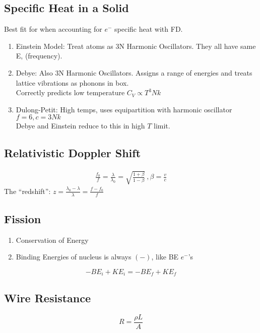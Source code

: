 \documentclass[10pt,a4paper]{article}
\begin{document}
\subsection{Specific Heat in a Solid}
Best fit for when accounting for $e^-$ specific heat with FD.
\begin{enumerate}
    \item Einstein Model: Treat atoms as 3N Harmonic Oscillators. They all have same E, (frequency).
    \item Debye: Also 3N Harmonic Oscillators. Assigns a range of energies and treats lattice vibrations as phonons in box.\\
    Correctly predicts low temperature $C_V \propto T^3Nk$
    \item Dulong-Petit: High temps, uses equipartition with harmonic oscillator $f=6,c=3Nk$\\
    Debye and Einstein reduce to this in high $T$ limit.
\end{enumerate}

\subsection{Relativistic Doppler Shift}
\begin{align}
 \frac{f_0}{f} = \frac{\lambda}{\lambda_0}  = \sqrt{\frac{1+\beta}{1-\beta}}~,\beta = \frac{v}{c}
\end{align}
The ``redshift'': $z = \frac{\lambda_0 - \lambda}{\lambda} = \frac{f - f_0}{f}$

\subsection{Fission}
\begin{enumerate}
    \item Conservation of Energy
    \item Binding Energies of nucleus is always $(-)$, like BE $e^-$'s
\end{enumerate}
\begin{equation}
 -BE_i + KE_i = -BE_f + KE_f 
\end{equation}

\subsection{Wire Resistance}
\begin{equation}
 R = \frac{\rho L}{A} 
\end{equation}
\end{document}
